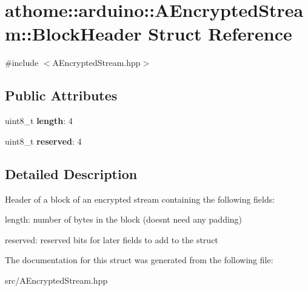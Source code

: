 \hypertarget{structathome_1_1arduino_1_1_a_encrypted_stream_1_1_block_header}{}\section{athome\+:\+:arduino\+:\+:A\+Encrypted\+Stream\+:\+:Block\+Header Struct Reference}
\label{structathome_1_1arduino_1_1_a_encrypted_stream_1_1_block_header}


{\ttfamily \#include $<$A\+Encrypted\+Stream.\+hpp$>$}

\subsection*{Public Attributes}
\begin{DoxyCompactItemize}
\item 
\mbox{\label{structathome_1_1arduino_1_1_a_encrypted_stream_1_1_block_header_a0c7f686ec04ed6b2c534090a0d5c688e}} 
uint8\+\_\+t {\bfseries length}\+: 4
\item 
\mbox{\label{structathome_1_1arduino_1_1_a_encrypted_stream_1_1_block_header_a1d26d080b529f89013b24a1d7748cb58}} 
uint8\+\_\+t {\bfseries reserved}\+: 4
\end{DoxyCompactItemize}


\subsection{Detailed Description}
Header of a block of an encrypted stream containing the following fields\+:


\begin{DoxyItemize}
\item length\+: number of bytes in the block (doesn\textquotesingle{}t need any padding)
\item reserved\+: reserved bits for later fields to add to the struct 
\end{DoxyItemize}

The documentation for this struct was generated from the following file\+:\begin{DoxyCompactItemize}
\item 
src/A\+Encrypted\+Stream.\+hpp\end{DoxyCompactItemize}
